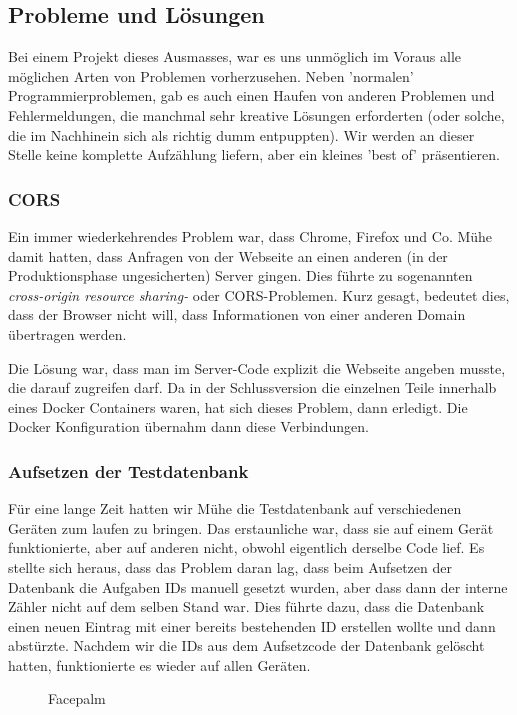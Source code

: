 \subsection{Probleme und Lösungen}

Bei einem Projekt dieses Ausmasses, war es uns unmöglich im Voraus alle möglichen Arten von Problemen vorherzusehen. Neben 'normalen' Programmierproblemen, gab es auch einen Haufen von anderen Problemen und Fehlermeldungen, die manchmal sehr kreative Lösungen erforderten (oder solche, die im Nachhinein sich als richtig dumm entpuppten). Wir werden an dieser Stelle keine komplette Aufzählung liefern, aber ein kleines 'best of' präsentieren.

\subsubsection{CORS} 
Ein immer wiederkehrendes Problem war, dass Chrome, Firefox und Co. Mühe damit hatten, dass Anfragen von der Webseite an einen anderen (in der Produktionsphase ungesicherten) Server gingen. Dies führte zu sogenannten \emph{cross-origin resource sharing-} oder CORS-Problemen. Kurz gesagt, bedeutet dies, dass der Browser nicht will, dass Informationen von einer anderen Domain übertragen werden.

Die Lösung war, dass man im Server-Code explizit die Webseite angeben musste, die darauf zugreifen darf. Da in der Schlussversion die einzelnen Teile innerhalb eines Docker Containers waren, hat sich dieses Problem, dann erledigt. Die Docker Konfiguration übernahm dann diese Verbindungen.

\subsubsection{Aufsetzen der Testdatenbank}
Für eine lange Zeit hatten wir Mühe die Testdatenbank auf verschiedenen Geräten zum laufen zu bringen. Das erstaunliche war, dass sie auf einem Gerät funktionierte, aber auf anderen nicht, obwohl eigentlich derselbe Code lief. Es stellte sich heraus, dass das Problem daran lag, dass beim Aufsetzen der Datenbank die Aufgaben IDs manuell gesetzt wurden, aber dass dann der interne Zähler nicht auf dem selben Stand war. Dies führte dazu, dass die Datenbank einen neuen Eintrag mit einer bereits bestehenden ID erstellen wollte und dann abstürzte. Nachdem wir die IDs aus dem Aufsetzcode der Datenbank gelöscht hatten, funktionierte es wieder auf allen Geräten.

\begin{figure}[ht]
    \caption{Facepalm \cite{fig:facepalm}}
\end{figure}

